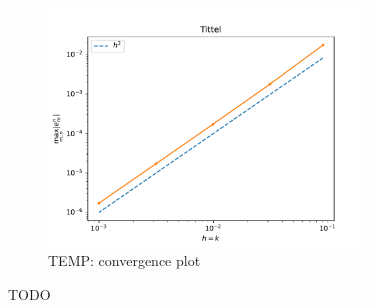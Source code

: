 \begin{figure}[h]
    \centering
    \includegraphics[width=0.75\textwidth]{Images/plots/temp_task1.pdf}
    \caption{TEMP: convergence plot}
    \label{fig:mesh1}
\end{figure}

TODO
